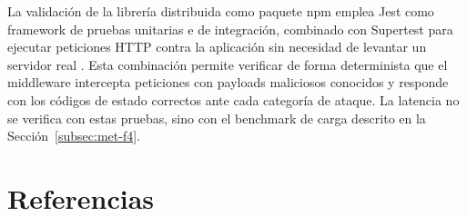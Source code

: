 La validación de la librería distribuida como paquete npm emplea Jest como framework de pruebas
unitarias e de integración, combinado con Supertest para ejecutar peticiones HTTP contra la
aplicación sin necesidad de levantar un servidor real \cite{jestdocs, supertestdocs}. Esta
combinación permite verificar de forma determinista que el middleware intercepta peticiones con
payloads maliciosos conocidos y responde con los códigos de estado correctos ante cada categoría de
ataque. La latencia no se verifica con estas pruebas, sino con el benchmark de carga descrito en la
Sección~\ref{subsec:met-f4}.

\ifdefined\modoensamble
\else
	\section*{Referencias}
	\printbibliography[heading=none]
	
\fi
